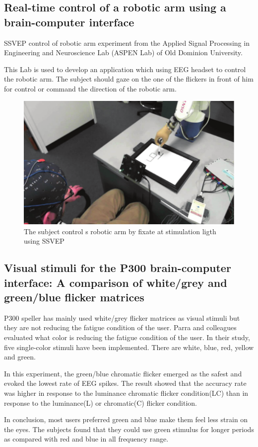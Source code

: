 \subsection {Real-time control of a robotic arm using a brain-computer interface\cite{ref2}}

\hspace{1.5cm} SSVEP control of robotic arm experiment from the Applied Signal Processing in Engineering and Neuroscience Lab (ASPEN Lab) of Old Dominion University.\par
This Lab is used to develop an application which using EEG headset to control the robotic arm. The subject should gaze on the one of the flickers in front of him for control or command the direction of the robotic arm.
\begin{figure}[ht]
	\centering
  	\includegraphics[scale = 0.70]{chapter2/22.pdf}
  	\caption{The subject control s robotic arm by fixate at stimulation ligth using SSVEP}
\end{figure}
\newpage

\subsection {Visual stimuli for the P300 brain-computer interface: A comparison of white/grey and green/blue flicker matrices\cite{ref3}}

\hspace{1.5cm}P300 speller has mainly used white/grey flicker matrices as visual stimuli but they are not reducing the fatigue condition of the user. Parra and colleagues evaluated what color is reducing the fatigue condition of the user. In their study, five single-color stimuli have been implemented. There are white, blue, red, yellow and green.\par
In this experiment, the green/blue chromatic flicker emerged as the safest and evoked the lowest rate of EEG spikes. The result showed that the accuracy rate was higher in response to the luminance chromatic flicker condition(LC) than in response to the luminance(L) or chromatic(C) flicker condition.\par
In conclusion, most users preferred green and blue make them feel less strain on the eyes. The subjects found that they could use green stimulus for longer periods as compared with red and blue in all frequency range.

